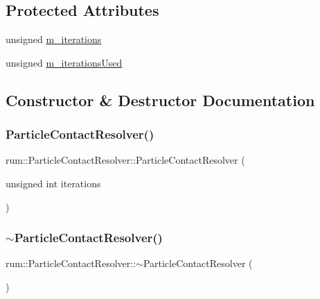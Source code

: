 \subsection*{Protected Attributes}
\begin{DoxyCompactItemize}
\item 
unsigned \hyperlink{classrum_1_1_particle_contact_resolver_a123300d59a87b791f53844d992b87ab7}{m\+\_\+iterations}
\item 
unsigned \hyperlink{classrum_1_1_particle_contact_resolver_ab86206e4f42fb6da8b7e6337d393cfdf}{m\+\_\+iterations\+Used}
\end{DoxyCompactItemize}


\subsection{Constructor \& Destructor Documentation}
\mbox{\label{classrum_1_1_particle_contact_resolver_a1921a5520c8940065d04f3bb890680bc}} 
\subsubsection{\texorpdfstring{Particle\+Contact\+Resolver()}{ParticleContactResolver()}}
{\footnotesize\ttfamily rum\+::\+Particle\+Contact\+Resolver\+::\+Particle\+Contact\+Resolver (\begin{DoxyParamCaption}\item[{unsigned int}]{iterations }\end{DoxyParamCaption})}

\mbox{\label{classrum_1_1_particle_contact_resolver_aa87e6c4d5a737b9882969350c99505b9}} 
\subsubsection{\texorpdfstring{$\sim$\+Particle\+Contact\+Resolver()}{~ParticleContactResolver()}}
{\footnotesize\ttfamily rum\+::\+Particle\+Contact\+Resolver\+::$\sim$\+Particle\+Contact\+Resolver (\begin{DoxyParamCaption}{ }\end{DoxyParamCaption})}



